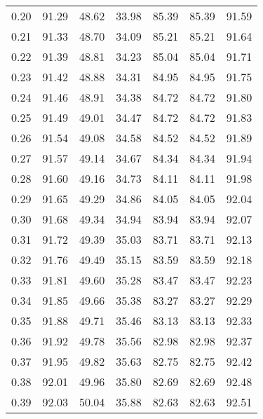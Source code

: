 \begin{tabular}{|c|c|c|c|c|c|c|}
      0.20 &     91.29 &     48.62 &      33.98 &   85.39 &      85.39 &         91.59 \\
      0.21 &     91.33 &     48.70 &      34.09 &   85.21 &      85.21 &         91.64 \\
      0.22 &     91.39 &     48.81 &      34.23 &   85.04 &      85.04 &         91.71 \\
      0.23 &     91.42 &     48.88 &      34.31 &   84.95 &      84.95 &         91.75 \\
      0.24 &     91.46 &     48.91 &      34.38 &   84.72 &      84.72 &         91.80 \\
      0.25 &     91.49 &     49.01 &      34.47 &   84.72 &      84.72 &         91.83 \\
      0.26 &     91.54 &     49.08 &      34.58 &   84.52 &      84.52 &         91.89 \\
      0.27 &     91.57 &     49.14 &      34.67 &   84.34 &      84.34 &         91.94 \\
      0.28 &     91.60 &     49.16 &      34.73 &   84.11 &      84.11 &         91.98 \\
      0.29 &     91.65 &     49.29 &      34.86 &   84.05 &      84.05 &         92.04 \\
      0.30 &     91.68 &     49.34 &      34.94 &   83.94 &      83.94 &         92.07 \\
      0.31 &     91.72 &     49.39 &      35.03 &   83.71 &      83.71 &         92.13 \\
      0.32 &     91.76 &     49.49 &      35.15 &   83.59 &      83.59 &         92.18 \\
      0.33 &     91.81 &     49.60 &      35.28 &   83.47 &      83.47 &         92.23 \\
      0.34 &     91.85 &     49.66 &      35.38 &   83.27 &      83.27 &         92.29 \\
      0.35 &     91.88 &     49.71 &      35.46 &   83.13 &      83.13 &         92.33 \\
      0.36 &     91.92 &     49.78 &      35.56 &   82.98 &      82.98 &         92.37 \\
      0.37 &     91.95 &     49.82 &      35.63 &   82.75 &      82.75 &         92.42 \\
      0.38 &     92.01 &     49.96 &      35.80 &   82.69 &      82.69 &         92.48 \\
      0.39 &     92.03 &     50.04 &      35.88 &   82.63 &      82.63 &         92.51 \\

\end{tabular}
